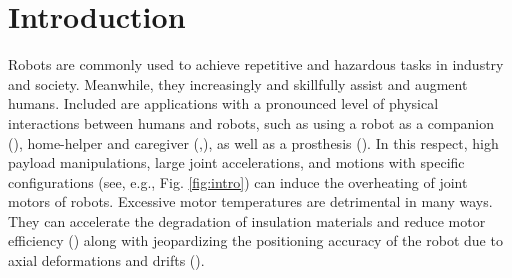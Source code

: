 \documentclass{ifacconf}
\begin{document}
\section{Introduction}
Robots are commonly used to  achieve repetitive and hazardous tasks in industry and society. Meanwhile, they increasingly and skillfully assist and augment humans. Included are  applications with a pronounced level of physical interactions between humans and robots, such as using a robot as a companion (\cite{basha2025robotic}), home-helper and caregiver (\cite{tsui2025exploring},\cite{gkiolnta2025challenges}), as well as a prosthesis (\cite{kim2025mode}). In this respect, high payload manipulations, large joint accelerations, and motions with specific configurations (see, e.g., Fig. \ref{fig:intro}) can induce the overheating of joint motors of robots. Excessive motor temperatures are detrimental in many ways. They can accelerate the degradation of insulation materials and reduce motor efficiency (\cite{yehorov2025study}) along with jeopardizing the positioning accuracy of the robot due to axial  deformations and drifts (\cite{soga2024skillful}). 
\end{document}

